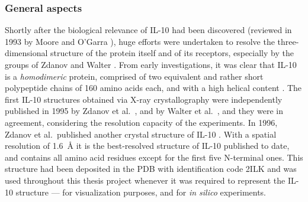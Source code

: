\subsubsection{General aspects}
Shortly after the biological relevance of IL-10 had been discovered (reviewed in
1993 by Moore and O'Garra \cite{il10_first_review_1993}), huge efforts were
undertaken to resolve the three-dimensional structure of the protein itself and
of its receptors, especially by the groups of Zdanov and Walter
\cite{zdanov_review_2010, zdanov_review_2004, bookchapter_walter_il10_2004}.
From early investigations, it was clear that IL-10 is a \textit{homodimeric}
protein, comprised of two equivalent and rather short polypeptide chains of 160
amino acids each, and with a high helical content
\cite{vieira_moore_il10homodimer_1991}. The first IL-10 structures obtained via
X-ray crystallography were independently published in 1995 by Zdanov et al.\
\cite{Zdanov1995}, and by Walter et al.\ \cite{il10_crystal_walter_1995}, and
they were in agreement, considering the resolution capacity of the experiments.
In 1996, Zdanov et al.\ published another crystal structure of IL-10
\cite{Zdanov1996}. With a spatial resolution of \SI{1.6}{\angstrom} it is the
best-resolved structure of IL-10 published to date, and contains all amino acid
residues except for the first five N-terminal ones. This structure had been
deposited in the PDB with identification code 2ILK and was used throughout this
thesis project whenever it was required to represent the IL-10 structure --- for
visualization purposes, and for \textit{in silico} experiments.

